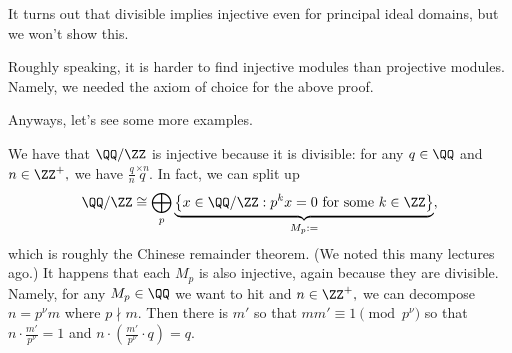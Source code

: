 It turns out that divisible implies injective even for principal ideal domains, but we won't show this.
\begin{remark}
	Roughly speaking, it is harder to find injective modules than projective modules. Namely, we needed the axiom of choice for the above proof.
\end{remark}
Anyways, let's see some more examples.
\begin{ex}
	We have that $\QQ/\ZZ$ is injective because it is divisible: for any $q\in\QQ$ and $n\in\ZZ^+,$ we have $\frac qn\stackrel{\times n}q.$ In fact, we can split up
	\[\QQ/\ZZ\cong\bigoplus_p\underbrace{\left\{x\in\QQ/\ZZ:p^kx=0\text{ for some }k\in\ZZ\right\}}_{M_p:=},\]
	which is roughly the Chinese remainder theorem. (We noted this many lectures ago.) It happens that each $M_p$ is also injective, again because they are divisible. Namely, for any $M_p\in\QQ$ we want to hit and $n\in\ZZ^+,$ we can decompose $n=p^\nu m$ where $p\nmid m.$ Then there is $m'$ so that $mm'\equiv1\pmod{p^\nu}$ so that $n\cdot\frac{m'}{p^\nu}=1$ and $n\cdot\left(\frac{m'}{p^\nu}\cdot q\right)=q.$
\end{ex}

